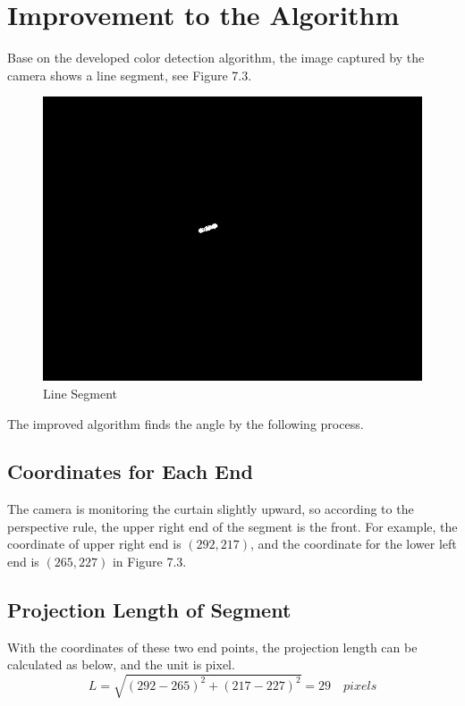 \section{Improvement to the Algorithm}
Base on the developed color detection algorithm, the image captured by the camera shows a line segment, see Figure 7.3.
\begin{figure}[ht!]
\begin{center}
\includegraphics[scale = 0.6]{pics/segment.png}
\caption{Line Segment}
\end{center}
\end{figure}
The improved algorithm finds the angle by the following process. 
\subsection{Coordinates for Each End}

The camera is monitoring the curtain slightly upward, so according to the perspective rule, the upper right end of the segment is the front. For example, the coordinate of upper right end is $(292,217)$, and the coordinate for the lower left end is $(265, 227)$ in Figure 7.3.

\subsection{Projection Length of Segment}

With the coordinates of these two end points, the projection length can be calculated as below, and the unit is pixel. 
\begin{equation}
L = \sqrt{(292-265)^2+(217-227)^2} = 29 \quad pixels
\end{equation}


